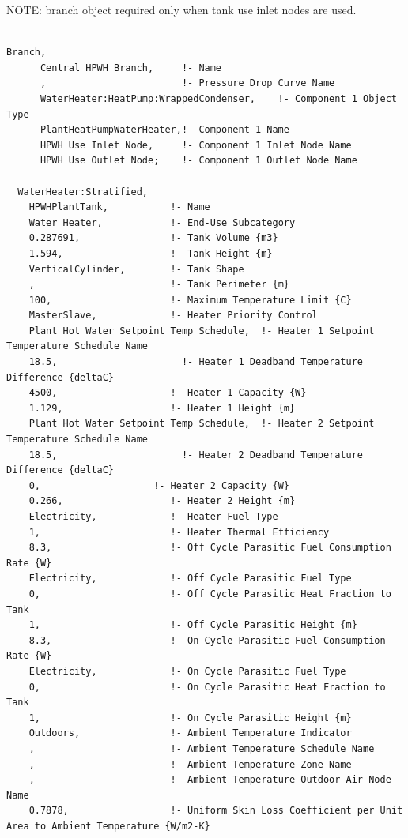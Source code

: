 NOTE: branch object required only when tank use inlet nodes are used.

\begin{lstlisting}

Branch,
      Central HPWH Branch,     !- Name
      ,                        !- Pressure Drop Curve Name
      WaterHeater:HeatPump:WrappedCondenser,    !- Component 1 Object Type
      PlantHeatPumpWaterHeater,!- Component 1 Name
      HPWH Use Inlet Node,     !- Component 1 Inlet Node Name
      HPWH Use Outlet Node;    !- Component 1 Outlet Node Name

  WaterHeater:Stratified,
    HPWHPlantTank,           !- Name
    Water Heater,            !- End-Use Subcategory
    0.287691,                !- Tank Volume {m3}
    1.594,                   !- Tank Height {m}
    VerticalCylinder,        !- Tank Shape
    ,                        !- Tank Perimeter {m}
    100,                     !- Maximum Temperature Limit {C}
    MasterSlave,             !- Heater Priority Control
    Plant Hot Water Setpoint Temp Schedule,  !- Heater 1 Setpoint Temperature Schedule Name
    18.5,                      !- Heater 1 Deadband Temperature Difference {deltaC}
    4500,                    !- Heater 1 Capacity {W}
    1.129,                   !- Heater 1 Height {m}
    Plant Hot Water Setpoint Temp Schedule,  !- Heater 2 Setpoint Temperature Schedule Name
    18.5,                      !- Heater 2 Deadband Temperature Difference {deltaC}
    0,                    !- Heater 2 Capacity {W}
    0.266,                   !- Heater 2 Height {m}
    Electricity,             !- Heater Fuel Type
    1,                       !- Heater Thermal Efficiency
    8.3,                     !- Off Cycle Parasitic Fuel Consumption Rate {W}
    Electricity,             !- Off Cycle Parasitic Fuel Type
    0,                       !- Off Cycle Parasitic Heat Fraction to Tank
    1,                       !- Off Cycle Parasitic Height {m}
    8.3,                     !- On Cycle Parasitic Fuel Consumption Rate {W}
    Electricity,             !- On Cycle Parasitic Fuel Type
    0,                       !- On Cycle Parasitic Heat Fraction to Tank
    1,                       !- On Cycle Parasitic Height {m}
    Outdoors,                !- Ambient Temperature Indicator
    ,                        !- Ambient Temperature Schedule Name
    ,                        !- Ambient Temperature Zone Name
    ,                        !- Ambient Temperature Outdoor Air Node Name
    0.7878,                  !- Uniform Skin Loss Coefficient per Unit Area to Ambient Temperature {W/m2-K}

\end{lstlisting}
